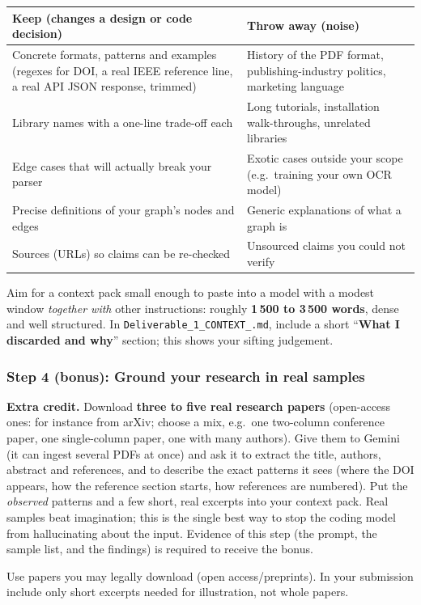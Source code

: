 \documentclass[11pt,a4paper]{article}
\newcommand{\uid}{[HeUserID]}
\newcommand{\dA}{\texttt{Deliverable\_1\_\allowbreak CONTEXT\_\allowbreak\uid.md}}
\begin{document}
\begin{tabularx}{\textwidth}{@{}LL@{}}
\toprule
\textbf{Keep (changes a design or code decision)} & \textbf{Throw away (noise)}\\
\midrule
Concrete formats, patterns and examples (regexes for DOI, a real IEEE reference line, a real API JSON response, trimmed) & History of the PDF format, publishing-industry politics, marketing language\\
Library names with a one-line trade-off each & Long tutorials, installation walk-throughs, unrelated libraries\\
Edge cases that will actually break your parser & Exotic cases outside your scope (e.g.\ training your own OCR model)\\
Precise definitions of your graph's nodes and edges & Generic explanations of what a graph is\\
Sources (URLs) so claims can be re-checked & Unsourced claims you could not verify\\
\bottomrule
\end{tabularx}

Aim for a context pack small enough to paste into a model with a modest window \emph{together with} other instructions: roughly \textbf{1\,500 to 3\,500 words}, dense and well structured. In \dA, include a short ``\textbf{What I discarded and why}'' section; this shows your sifting judgement.

\subsubsection{Step 4 (bonus): Ground your research in real samples}
\textbf{Extra credit.} Download \textbf{three to five real research papers} (open-access ones: for instance from arXiv; choose a mix, e.g.\ one two-column conference paper, one single-column paper, one with many authors). Give them to Gemini (it can ingest several PDFs at once) and ask it to extract the title, authors, abstract and references, and to describe the exact patterns it sees (where the DOI appears, how the reference section starts, how references are numbered). Put the \emph{observed} patterns and a few short, real excerpts into your context pack. Real samples beat imagination; this is the single best way to stop the coding model from hallucinating about the input. Evidence of this step (the prompt, the sample list, and the findings) is required to receive the bonus.

\begin{warnbox}
Use papers you may legally download (open access/preprints). In your submission include only short excerpts needed for illustration, not whole papers.
\end{warnbox}
\end{document}

